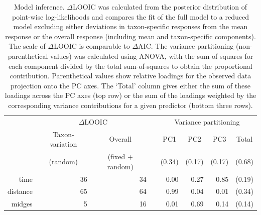 \documentclass[12pt]{article}
\begin{document}

%
% 






\clearpage




\clearpage

\begin{table}
\caption{\label{tab:model-summary}
Model inference.
$\Delta$LOOIC was calculated from the posterior distribution of point-wise log-likelihoods
and compares the fit of the full model to a reduced model excluding either
deviations in taxon-specific responses from the mean response or
the overall response (including mean and taxon-specific components).
The scale of $\Delta$LOOIC is comparable to $\Delta$AIC.
The variance partitioning (non-parenthetical values) was calculated using ANOVA,
with the sum-of-squares for each component divided by the total sum-of-squares 
to obtain the proportional contribution.
Parenthetical values show relative loadings for the observed data projection onto the PC axes.
The `Total' column gives either the sum of these loadings across the PC axes (top row) or 
the sum of the loadings weighted by the corresponding variance contributions for a given predictor
(bottom three rows).}
\begin{tabular}{rrrrrrrr}
\toprule
 & \multicolumn{2}{c}{$\Delta$LOOIC} & & \multicolumn{4}{c}{Variance partitioning} \\
 \cmidrule{2-3} \cmidrule{5-8}
 & \multicolumn{1}{c}{Taxon-variation} & \multicolumn{1}{c}{Overall} & &
    \multicolumn{1}{c}{PC1} & \multicolumn{1}{c}{PC2} & \multicolumn{1}{c}{PC3} &
    \multicolumn{1}{c}{Total} \\
& \multicolumn{1}{c}{(random)} & \multicolumn{1}{c}{(fixed + random)} & &
    \multicolumn{1}{c}{(0.34)} & \multicolumn{1}{c}{(0.17)} &
    \multicolumn{1}{c}{(0.17)} & \multicolumn{1}{c}{(0.68)} \\
\midrule
time & 36 & 34 &  & 0.00 & 0.27 & 0.85 & (0.19) \\
distance & 65 & 64 &  & 0.99 & 0.04 & 0.01 & (0.34) \\
midges & 5 & 16 &  & 0.01 & 0.69 & 0.14 & (0.14)\\
\bottomrule
\end{tabular}
\end{table}
\end{document}
